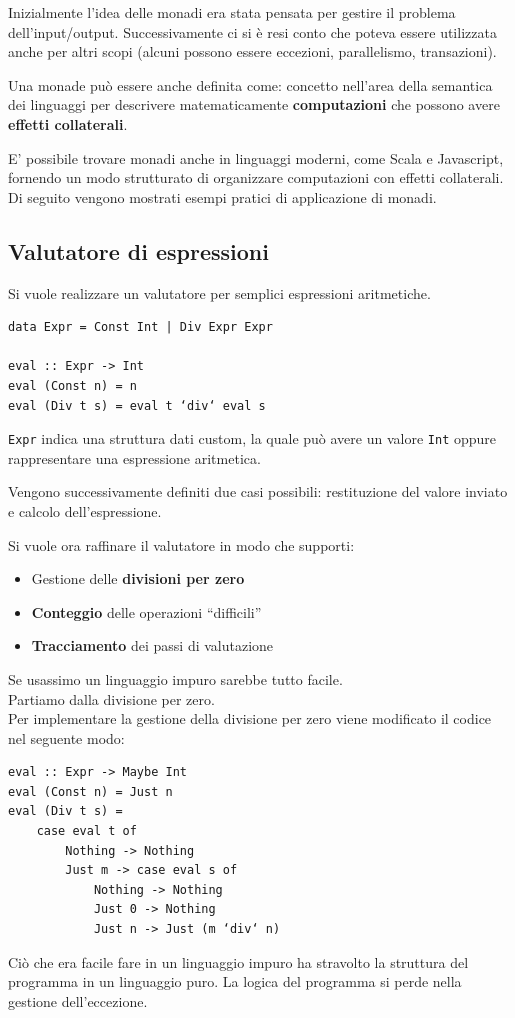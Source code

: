 \documentclass{article}
\begin{document}
Inizialmente l'idea delle monadi era stata pensata per gestire il problema dell'input/output. Successivamente ci si è resi conto che poteva essere utilizzata anche per altri scopi (alcuni possono essere eccezioni, parallelismo, transazioni).

Una monade può essere anche definita come: concetto nell’area della semantica dei linguaggi per descrivere matematicamente \textbf{computazioni} che possono avere \textbf{effetti collaterali}.

E' possibile trovare monadi anche in linguaggi moderni, come Scala e Javascript, fornendo un modo strutturato di organizzare computazioni con effetti collaterali.\vspace{14pt}\\
Di seguito vengono mostrati esempi pratici di applicazione di monadi.

\pagebreak

\subsection*{Valutatore di espressioni}
Si vuole realizzare un valutatore per semplici espressioni aritmetiche.
\begin{tcolorbox}
\begin{verbatim}
data Expr = Const Int | Div Expr Expr

eval :: Expr -> Int
eval (Const n) = n
eval (Div t s) = eval t ‘div‘ eval s
\end{verbatim}
\end{tcolorbox}
\texttt{Expr} indica una struttura dati custom, la quale può avere un valore \texttt{Int} oppure rappresentare una espressione aritmetica.

Vengono successivamente definiti due casi possibili: restituzione del valore inviato e calcolo dell'espressione.

Si vuole ora raffinare il valutatore in modo che supporti:
\begin{itemize}
    \item Gestione delle \textbf{divisioni per zero}
    \item \textbf{Conteggio} delle operazioni “difficili”
    \item \textbf{Tracciamento} dei passi di valutazione
\end{itemize}
Se usassimo un linguaggio impuro sarebbe tutto facile.\vspace{14pt}\\
Partiamo dalla divisione per zero.\\
Per implementare la gestione della divisione per zero viene modificato il codice nel seguente modo:
\begin{tcolorbox}
\begin{verbatim}
eval :: Expr -> Maybe Int
eval (Const n) = Just n
eval (Div t s) =
    case eval t of
        Nothing -> Nothing
        Just m -> case eval s of
            Nothing -> Nothing
            Just 0 -> Nothing
            Just n -> Just (m ‘div‘ n)
\end{verbatim}
\end{tcolorbox}
Ciò che era facile fare in un linguaggio impuro ha stravolto la struttura del programma in un linguaggio puro. La logica del programma si perde nella gestione dell’eccezione.
\end{document}
